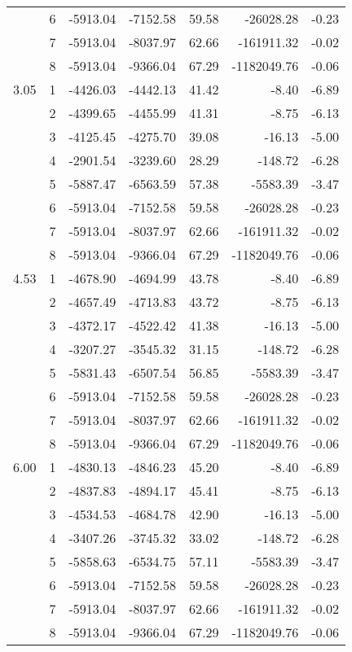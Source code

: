 \documentclass[12pt]{article}
\begin{document}
\begin{table}[H]
\begin{tabular}{llrrrrr}
             & 6 &   -5913.04 & -7152.58 & 59.58 &   -26028.28 &     -0.23 \\
             & 7 &   -5913.04 & -8037.97 & 62.66 &  -161911.32 &     -0.02 \\
             & 8 &   -5913.04 & -9366.04 & 67.29 & -1182049.76 &     -0.06 \\
        3.05 & 1 &   -4426.03 & -4442.13 & 41.42 &       -8.40 &     -6.89 \\
             & 2 &   -4399.65 & -4455.99 & 41.31 &       -8.75 &     -6.13 \\
             & 3 &   -4125.45 & -4275.70 & 39.08 &      -16.13 &     -5.00 \\
             & 4 &   -2901.54 & -3239.60 & 28.29 &     -148.72 &     -6.28 \\
             & 5 &   -5887.47 & -6563.59 & 57.38 &    -5583.39 &     -3.47 \\
             & 6 &   -5913.04 & -7152.58 & 59.58 &   -26028.28 &     -0.23 \\
             & 7 &   -5913.04 & -8037.97 & 62.66 &  -161911.32 &     -0.02 \\
             & 8 &   -5913.04 & -9366.04 & 67.29 & -1182049.76 &     -0.06 \\
        4.53 & 1 &   -4678.90 & -4694.99 & 43.78 &       -8.40 &     -6.89 \\
             & 2 &   -4657.49 & -4713.83 & 43.72 &       -8.75 &     -6.13 \\
             & 3 &   -4372.17 & -4522.42 & 41.38 &      -16.13 &     -5.00 \\
             & 4 &   -3207.27 & -3545.32 & 31.15 &     -148.72 &     -6.28 \\
             & 5 &   -5831.43 & -6507.54 & 56.85 &    -5583.39 &     -3.47 \\
             & 6 &   -5913.04 & -7152.58 & 59.58 &   -26028.28 &     -0.23 \\
             & 7 &   -5913.04 & -8037.97 & 62.66 &  -161911.32 &     -0.02 \\
             & 8 &   -5913.04 & -9366.04 & 67.29 & -1182049.76 &     -0.06 \\
        6.00 & 1 &   -4830.13 & -4846.23 & 45.20 &       -8.40 &     -6.89 \\
             & 2 &   -4837.83 & -4894.17 & 45.41 &       -8.75 &     -6.13 \\
             & 3 &   -4534.53 & -4684.78 & 42.90 &      -16.13 &     -5.00 \\
             & 4 &   -3407.26 & -3745.32 & 33.02 &     -148.72 &     -6.28 \\
             & 5 &   -5858.63 & -6534.75 & 57.11 &    -5583.39 &     -3.47 \\
             & 6 &   -5913.04 & -7152.58 & 59.58 &   -26028.28 &     -0.23 \\
             & 7 &   -5913.04 & -8037.97 & 62.66 &  -161911.32 &     -0.02 \\
             & 8 &   -5913.04 & -9366.04 & 67.29 & -1182049.76 &     -0.06 \\
        \bottomrule
    \end{tabular}
\end{table}
\end{document}
